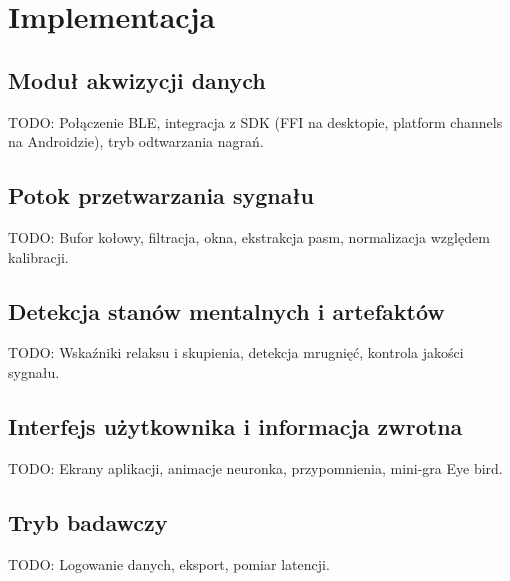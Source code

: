 \chapter{Implementacja}
\label{chapt:Implementacja}

\section{Moduł akwizycji danych}
TODO: Połączenie BLE, integracja z SDK (FFI na desktopie, platform channels na Androidzie), tryb odtwarzania nagrań.

\section{Potok przetwarzania sygnału}
TODO: Bufor kołowy, filtracja, okna, ekstrakcja pasm, normalizacja względem kalibracji.

\section{Detekcja stanów mentalnych i artefaktów}
TODO: Wskaźniki relaksu i skupienia, detekcja mrugnięć, kontrola jakości sygnału.

\section{Interfejs użytkownika i informacja zwrotna}
TODO: Ekrany aplikacji, animacje neuronka, przypomnienia, mini-gra Eye bird.

\section{Tryb badawczy}
TODO: Logowanie danych, eksport, pomiar latencji.
